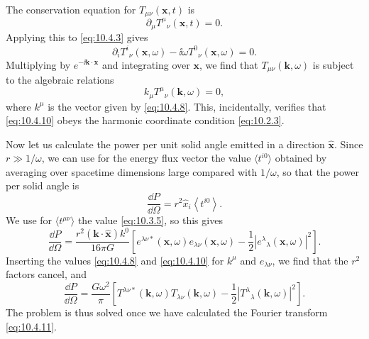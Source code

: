 The conservation equation for \(T_{\mu\nu}(\mathbf{x},t)\) is
\[
  \partial_\mu T^\mu{}_\nu(\mathbf{x},t)=0.
\]
Applying this to \eqref{eq:10.4.3} gives
\[
  \partial_iT^i{}_\nu(\mathbf{x},\omega)
  -\ii\omega T^0{}_\nu(\mathbf{x},\omega)=0.
\]
Multiplying by \(e^{-\ii\mathbf{k}\cdot\mathbf{x}}\) and integrating over
\(\mathbf{x}\), we find that \(T_{\mu\nu}(\mathbf{k},\omega)\) is subject to
the algebraic relations
\begin{equation}
  k_\mu T^\mu{}_\nu(\mathbf{k},\omega)=0,
  \tag{10.4.12}\label{eq:10.4.12}
\end{equation}
where \(k^\mu\) is the vector given by \eqref{eq:10.4.8}. This, incidentally,
verifies that \eqref{eq:10.4.10} obeys the harmonic coordinate condition
\eqref{eq:10.2.3}.

Now let us calculate the power per unit solid angle emitted in a direction
\(\widehat{\mathbf{x}}\). Since \(r\gg1/\omega\), we can use for the energy
flux vector the value \(\langle t^{i0}\rangle\) obtained by averaging over
spacetime dimensions large compared with \(1/\omega\), so that the power per
solid angle is
\[
  \frac{\dd P}{\dd\Omega}
  =
  r^2\widehat x_i\left\langle t^{i0}\right\rangle.
\]
We use for \(\langle t^{\mu\nu}\rangle\) the value \eqref{eq:10.3.5}, so
this gives
\[
  \frac{\dd P}{\dd\Omega}
  =
  \frac{r^2(\mathbf{k}\cdot\widehat{\mathbf{x}})k^0}{16\pi G}
  \left[
    e^{\lambda\nu*}(\mathbf{x},\omega)e_{\lambda\nu}(\mathbf{x},\omega)
    -\frac12\left|e^\lambda{}_\lambda(\mathbf{x},\omega)\right|^2
  \right].
\]
Inserting the values \eqref{eq:10.4.8} and \eqref{eq:10.4.10} for
\(k^\mu\) and \(e_{\lambda\nu}\), we find that the \(r^2\) factors cancel,
and
\begin{equation}
  \frac{\dd P}{\dd\Omega}
  =
  \frac{G\omega^2}{\pi}
  \left[
    T^{\lambda\nu*}(\mathbf{k},\omega)
    T_{\lambda\nu}(\mathbf{k},\omega)
    -\frac12
    \left|T^\lambda{}_\lambda(\mathbf{k},\omega)\right|^2
  \right].
  \tag{10.4.13}\label{eq:10.4.13}
\end{equation}
The problem is thus solved once we have calculated the Fourier transform
\eqref{eq:10.4.11}.

